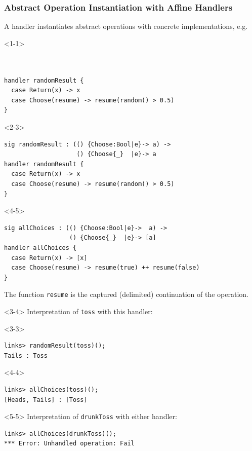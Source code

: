 \documentclass[10pt,compress]{beamer}
\begin{document}
\begin{frame}[fragile]
  \frametitle{Abstract Operation Instantiation with Affine Handlers} 
%
  A handler instantiates abstract operations with concrete
  implementations, e.g.
\begin{onlyenv}<1-1>
\begin{lstlisting}


handler randomResult {
  case Return(x) -> x
  case Choose(resume) -> resume(random() > 0.5)
}
\end{lstlisting}
\end{onlyenv}
%
\begin{onlyenv}<2-3>
\begin{lstlisting}
sig randomResult : (() {Choose:Bool|e}-> a) -> 
                    () {Choose{_}  |e}-> a
handler randomResult {
  case Return(x) -> x
  case Choose(resume) -> resume(random() > 0.5)
}
\end{lstlisting}
\end{onlyenv}
%
\begin{onlyenv}<4-5>
\begin{lstlisting}
sig allChoices : (() {Choose:Bool|e}->  a) -> 
                  () {Choose{_}  |e}-> [a]
handler allChoices {
  case Return(x) -> [x]
  case Choose(resume) -> resume(true) ++ resume(false)
}
\end{lstlisting}
\end{onlyenv}
%
The function \lstinline$resume$ is the captured (delimited) continuation of the operation.
\vfill
\begin{onlyenv}<3-4>
Interpretation of \lstinline$toss$ with this handler:
\begin{onlyenv}<3-3>
\begin{lstlisting}[style=terminal]
links> randomResult(toss)();
Tails : Toss
\end{lstlisting}
\end{onlyenv}
%
\begin{onlyenv}<4-4>
\begin{lstlisting}[style=terminal]
links> allChoices(toss)();
[Heads, Tails] : [Toss]
\end{lstlisting}
\end{onlyenv}
\end{onlyenv}

\begin{onlyenv}<5-5>
Interpretation of \lstinline$drunkToss$ with either handler:
\begin{lstlisting}[style=terminal]
links> allChoices(drunkToss)();
*** Error: Unhandled operation: Fail
\end{lstlisting}
\end{onlyenv}
\end{frame}
\end{document}
